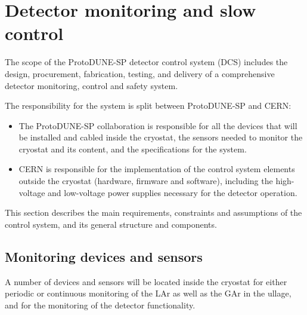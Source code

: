 \section{Detector monitoring and slow control}
\label{sec:slowcontrol}

The scope of the ProtoDUNE-SP detector control system (DCS) includes the design, procurement, fabrication, testing,
and delivery
of a comprehensive detector monitoring, control and safety system.

The responsibility for the system is split between ProtoDUNE-SP and CERN: 
\begin{itemize}
\item	The ProtoDUNE-SP collaboration is responsible for all the devices that will be installed and cabled inside 
the cryostat, the sensors needed to monitor the cryostat and its content, and the specifications for the system. %
\item	CERN is responsible for the implementation of the control system elements outside the cryostat (hardware, firmware and software), including the high-voltage and low-voltage power supplies necessary for the detector operation.
\end{itemize}

This section describes %
the main requirements, 
constraints and assumptions of the control system, and its general structure and components. 

\subsection{Monitoring devices and sensors}
\label{sec:mon-dev-sensors}

A number of %
devices and sensors will be located inside the cryostat for either periodic or continuous monitoring of %
the LAr as well as the GAr in the ullage, %
and for the monitoring of the detector functionality.


